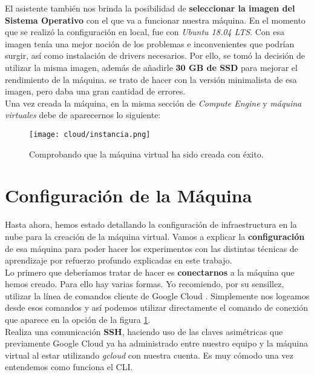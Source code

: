 \documentclass[11pt,fleqn]{book} %
\begin{document}
El asistente también nos brinda la posibilidad de \textbf{seleccionar la imagen del Sistema Operativo} con el que va a funcionar nuestra máquina. En el momento que se realizó la configuración en local, fue con \textit{Ubuntu 18.04 LTS}. Con esa imagen tenía una mejor noción de los problemas e inconvenientes que podrían surgir, así como instalación de drivers necesarios. Por ello, se tomó la decisión de utilizar la misma imagen, además de añadirle \textbf{30 GB de SSD} para mejorar el rendimiento de la máquina. se trato de hacer con la versión minimalista de esa imagen, pero daba una gran cantidad de errores. \\

Una vez creada la máquina, en la misma sección de \textit{Compute Engine} y \textit{máquina virtuales} debe de aparecernos lo siguiente:

\begin{figure}[H]
	\centering\texttt{[image: cloud/instancia.png]}
	\caption{Comprobando que la máquina virtual ha sido creada con éxito.}
	\label{fig:cloudinstancia} %
\end{figure} 

\section{Configuración de la Máquina}\label{sec:configuracionmaquina}

Hasta ahora, hemos estado detallando la configuración de infraestructura en la nube para la creación de la máquina virtual. Vamos a explicar la \textbf{configuración} de esa máquina para poder hacer los experimentos con las distintas técnicas de aprendizaje por refuerzo profundo explicadas en este trabajo. \\

Lo primero que deberíamos tratar de hacer es \textbf{conectarnos} a la máquina que hemos creado. Para ello hay varias formas. Yo recomiendo, por su sensillez, utilizar la línea de comandos cliente de Google Cloud \cite{article:gcloud}. Simplemente nos logeamos desde esos comandos y así podemos utilizar directamente el comando de conexión que aparece en la opción de la figura \ref{fig:cloudinstancia}. \\

Realiza una comunicación \textbf{SSH}, haciendo uso de las claves asimétricas que previamente Google Cloud ya ha administrado entre nuestro equipo y la máquina virtual al estar utilizando \textit{gcloud} con nuestra cuenta. Es muy cómodo una vez entendemos como funciona el CLI. \\
\end{document}
